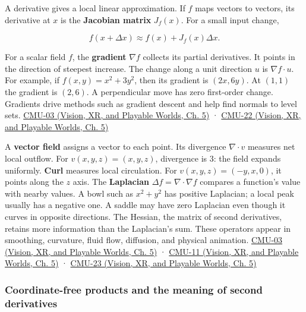 A derivative gives a local linear approximation. If \(f\) maps vectors to vectors, its derivative at \(x\) is the \textbf{Jacobian matrix} \(J_f(x)\). For a small input change,

\[
f(x+\Delta x)\approx f(x)+J_f(x)\Delta x.
\]

For a scalar field \(f\), the \textbf{gradient} \(\nabla f\) collects its partial derivatives. It points in the direction of steepest increase. The change along a unit direction \(u\) is \(\nabla f\cdot u\). For example, if \(f(x,y)=x^2+3y^2\), then its gradient is \((2x,6y)\). At \((1,1)\) the gradient is \((2,6)\). A perpendicular move has zero first-order change. Gradients drive methods such as gradient descent and help find normals to level sets. \href{../07-Vision-XR-and-Playable-Worlds/main.pdf\#nameddest=04-visual-computing-ii-ch036-cmu-03---vector-calculus-preview}{CMU-03 (Vision, XR, and Playable Worlds, Ch. 5)} · \href{../07-Vision-XR-and-Playable-Worlds/main.pdf\#nameddest=04-visual-computing-ii-ch036-cmu-22---optimization}{CMU-22 (Vision, XR, and Playable Worlds, Ch. 5)}

A \textbf{vector field} assigns a vector to each point. Its divergence \(\nabla\cdot v\) measures net local outflow. For \(v(x,y,z)=(x,y,z)\), divergence is 3: the field expands uniformly. \textbf{Curl} measures local circulation. For \(v(x,y,z)=(-y,x,0)\), it points along the \(z\) axis. The \textbf{Laplacian} \(\Delta f=\nabla\cdot\nabla f\) compares a function's value with nearby values. A bowl such as \(x^2+y^2\) has positive Laplacian; a local peak usually has a negative one. A saddle may have zero Laplacian even though it curves in opposite directions. The Hessian, the matrix of second derivatives, retains more information than the Laplacian's sum. These operators appear in smoothing, curvature, fluid flow, diffusion, and physical animation. \href{../07-Vision-XR-and-Playable-Worlds/main.pdf\#nameddest=04-visual-computing-ii-ch036-cmu-03---vector-calculus-preview}{CMU-03 (Vision, XR, and Playable Worlds, Ch. 5)} · \href{../07-Vision-XR-and-Playable-Worlds/main.pdf\#nameddest=04-visual-computing-ii-ch036-cmu-11---digital-geometry-processing}{CMU-11 (Vision, XR, and Playable Worlds, Ch. 5)} · \href{../07-Vision-XR-and-Playable-Worlds/main.pdf\#nameddest=04-visual-computing-ii-ch036-cmu-23---physically-based-animation-and-pdes}{CMU-23 (Vision, XR, and Playable Worlds, Ch. 5)}

\subsubsection{Coordinate-free products and the meaning of second derivatives}\label{03-visual-computing-i-ch001-coordinate-free-products-and-the-meaning-of-second-derivatives}

